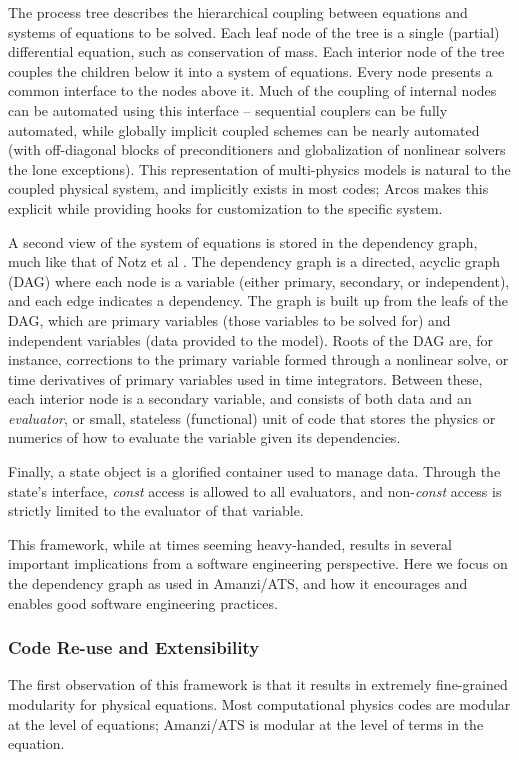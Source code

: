 The process tree describes the hierarchical coupling between equations and systems of equations to be solved.
Each leaf node of the tree is a single (partial) differential equation, such as conservation of mass.
Each interior node of the tree couples the children below it into a system of equations.
Every node presents a common interface to the nodes above it.
Much of the coupling of internal nodes can be automated using this interface -- sequential couplers can be fully automated, while globally implicit coupled schemes can be nearly automated (with off-diagonal blocks of preconditioners and globalization of nonlinear solvers the lone exceptions).
This representation of multi-physics models is natural to the coupled physical system, and implicitly exists in most codes; Arcos makes this explicit while providing hooks for customization to the specific system.

A second view of the system of equations is stored in the dependency graph, much like that of Notz et al \cite{Notz2012}.
The dependency graph is a directed, acyclic graph (DAG) where each node is a variable (either primary, secondary, or independent), and each edge indicates a dependency.
The graph is built up from the leafs of the DAG, which are primary variables (those variables to be solved for) and independent variables (data provided to the model).  Roots of the DAG are, for instance, corrections to the primary variable formed through a nonlinear solve, or time derivatives of primary variables used in time integrators.
Between these, each interior node is a secondary variable, and consists of both data and an \emph{evaluator}, or small, stateless (functional) unit of code that stores the physics or numerics of how to evaluate the variable given its dependencies.

Finally, a state object is a glorified container used to manage data.
Through the state's interface, \emph{const} access is allowed to all evaluators, and non-\emph{const} access is strictly limited to the evaluator of that variable.

This framework, while at times seeming heavy-handed, results in several important implications from a software engineering perspective.
Here we focus on the dependency graph as used in Amanzi/ATS, and how it encourages and enables good software engineering practices.

\subsubsection{Code Re-use and Extensibility}
\label{sec:amanzi:modularity}
The first observation of this framework is that it results in extremely fine-grained modularity for physical equations.
Most computational physics codes are modular at the level of equations; Amanzi/ATS is modular at the level of terms in the equation.

